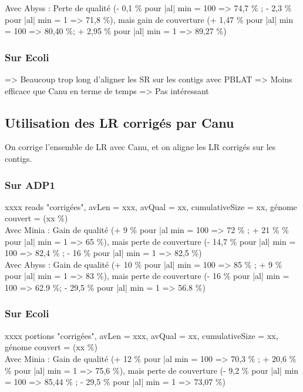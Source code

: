 \documentclass[12pt]{article}
\begin{document}
Avec Abyss : Perte de qualité (- 0,1 \% pour |al| min = 100 => 74,7 \% ; - 2,3 \% pour |al| min = 1 => 71,8 \%),
mais gain de couverture (+ 1,47 \% pour |al| min = 100 => 80,40 \%; + 2,95 \% pour |al| min = 1 => 89,27 \%)  

\subsubsection{Sur Ecoli}

=> Beaucoup trop long d'aligner les SR sur les contigs avec PBLAT => Moins efficace que Canu en terme de temps => Pas intéressant

\subsection{Utilisation des LR corrigés par Canu}

On corrige l'ensemble de LR avec Canu, et on aligne les LR corrigés sur les contigs. \\

\subsubsection{Sur ADP1}

xxxx reads "corrigées", avLen = xxx, avQual = xx, cumulativeSize = xx, génome couvert =  (xx \%) \\

Avec Minia : Gain de qualité (+ 9 \% pour |al min = 100 => 72 \% ; + 21 \% \% pour |al| min = 1 => 65 \%), 
mais perte de couverture (- 14,7 \% pour |al| min = 100 => 82,4 \% ; - 16 \% pour |al| min = 1 => 82,5 \%) \\

Avec Abyss : Gain de qualité (+ 10 \% pour |al| min = 100 => 85 \% ; + 9 \% pour |al| min = 1 => 83 \%),
mais perte de couverture (- 16 \% pour |al| min = 100 => 62.9 \%; - 29,5 \% pour |al| min = 1 => 56.8 \%)

\subsubsection{Sur Ecoli}

xxxx portions "corrigées", avLen = xxx, avQual = xx, cumulativeSize = xx, génome couvert =  (xx \%) \\

Avec Minia : Gain de qualité (+ 12 \% pour |al min = 100 => 70,3  \% ; + 20,6 \% \% pour |al| min = 1 => 75,6 \%), 
mais perte de couverture (- 9,2 \% pour |al| min = 100 => 85,44 \% ; - 29,5 \% pour |al| min = 1 => 73,07 \%) \\
\end{document}
